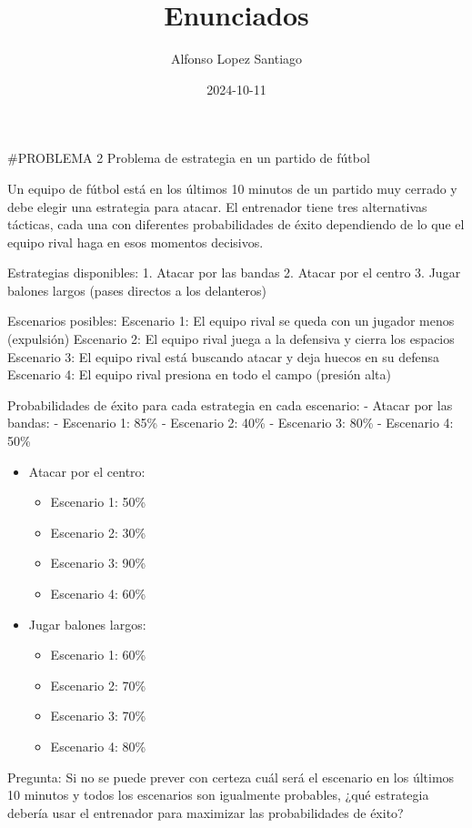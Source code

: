 \documentclass[
]{article}
\title{Enunciados}
\author{Alfonso Lopez Santiago}
\date{2024-10-11}
\providecommand{\tightlist}{%
  \setlength{\itemsep}{0pt}\setlength{\parskip}{0pt}}
\begin{document}
\maketitle

\#PROBLEMA 2 Problema de estrategia en un partido de fútbol

Un equipo de fútbol está en los últimos 10 minutos de un partido muy
cerrado y debe elegir una estrategia para atacar. El entrenador tiene
tres alternativas tácticas, cada una con diferentes probabilidades de
éxito dependiendo de lo que el equipo rival haga en esos momentos
decisivos.

Estrategias disponibles: 1. Atacar por las bandas 2. Atacar por el
centro 3. Jugar balones largos (pases directos a los delanteros)

Escenarios posibles: Escenario 1: El equipo rival se queda con un
jugador menos (expulsión) Escenario 2: El equipo rival juega a la
defensiva y cierra los espacios Escenario 3: El equipo rival está
buscando atacar y deja huecos en su defensa Escenario 4: El equipo rival
presiona en todo el campo (presión alta)

Probabilidades de éxito para cada estrategia en cada escenario: - Atacar
por las bandas: - Escenario 1: 85\% - Escenario 2: 40\% - Escenario 3:
80\% - Escenario 4: 50\%

\begin{itemize}
\tightlist
\item
  Atacar por el centro:

  \begin{itemize}
  \tightlist
  \item
    Escenario 1: 50\%
  \item
    Escenario 2: 30\%
  \item
    Escenario 3: 90\%
  \item
    Escenario 4: 60\%
  \end{itemize}
\item
  Jugar balones largos:

  \begin{itemize}
  \tightlist
  \item
    Escenario 1: 60\%
  \item
    Escenario 2: 70\%
  \item
    Escenario 3: 70\%
  \item
    Escenario 4: 80\%
  \end{itemize}
\end{itemize}

Pregunta: Si no se puede prever con certeza cuál será el escenario en
los últimos 10 minutos y todos los escenarios son igualmente probables,
¿qué estrategia debería usar el entrenador para maximizar las
probabilidades de éxito?
\end{document}
